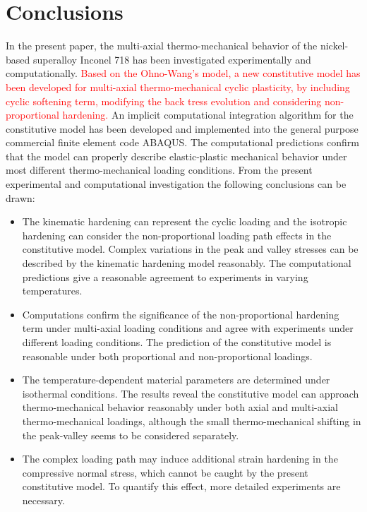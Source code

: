\documentclass[preprint,5p,twocolumn,11pt,sort&compress]{elsarticle}
\newcommand{\marked}[1]{\textcolor{red}{#1}}
\begin{document}
\section{Conclusions}
\noindent
In the present paper, the multi-axial thermo-mechanical behavior of the nickel-based superalloy Inconel 718 has been investigated experimentally and computationally.
\marked{Based on the Ohno-Wang's model, a new constitutive model has been developed for multi-axial thermo-mechanical cyclic plasticity, by including cyclic softening term, modifying the back tress evolution and considering non-proportional hardening.}
An implicit computational integration algorithm for the constitutive model has been developed and implemented into the general purpose commercial finite element code ABAQUS. The computational predictions confirm that the model can properly describe elastic-plastic mechanical behavior under most different thermo-mechanical loading conditions.
From the present experimental and computational investigation the following conclusions can be drawn:
\begin{itemize}

\item {The kinematic hardening can represent the cyclic loading and the isotropic hardening can consider the non-proportional loading path effects in the constitutive model.
Complex variations in the peak and valley stresses can be described by the kinematic hardening model reasonably. The computational predictions give a reasonable agreement to  experiments in varying temperatures.}

\item {Computations confirm the significance of the non-proportional hardening term under multi-axial loading conditions and agree with experiments under different loading conditions. The prediction of the constitutive model is reasonable under both proportional and non-proportional loadings.}

\item {The temperature-dependent material parameters are determined under isothermal conditions. The results reveal the constitutive model can approach thermo-mechanical behavior reasonably under both axial and multi-axial thermo-mechanical loadings, although the small thermo-mechanical shifting in the peak-valley seems to be considered separately.}

\item{The complex loading path may induce additional strain hardening in the compressive normal stress, which cannot be caught by the present constitutive model. To quantify this effect, more detailed experiments are necessary.}

\end{itemize}
\end{document}
